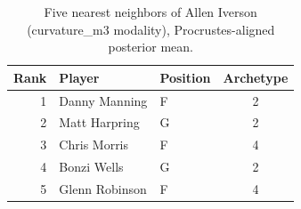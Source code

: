 \begin{table}[htbp]
  \centering\small
  \begin{tabular}{rllc}
    \toprule
    Rank & Player & Position & Archetype \\
    \midrule
    1 & Danny Manning & F & 2 \\
    2 & Matt Harpring & G & 2 \\
    3 & Chris Morris & F & 4 \\
    4 & Bonzi Wells & G & 2 \\
    5 & Glenn Robinson & F & 4 \\
    \bottomrule
  \end{tabular}
  \caption{Five nearest neighbors of Allen Iverson (curvature_m3 modality), Procrustes-aligned posterior mean.}
  \label{tab:Allen_Iverson_neighbors_curvature_m3}
\end{table}

